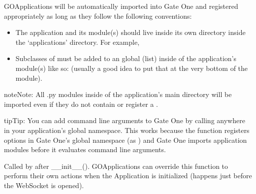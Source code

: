 \documentclass[letterpaper,10pt,openany]{sphinxmanual}
\begin{document}
\begin{fulllineitems}
GOApplications will be automatically imported into Gate One and registered
appropriately as long as they follow the following conventions:
\begin{itemize}
\item {} 
The application and its module(s) should live inside its own directory inside the `applications' directory.  For example, 

\item {} 
Subclasses of {\hyperref[Developer/server:gateone.core.server.GOApplication]{}} must be added to an  global (list) inside of the application's module(s) like so:  (usually a good idea to put that at the very bottom of the module).

\end{itemize}

\begin{notice}{note}{Note:}
All .py modules inside of the application's main directory will be
imported even if they do not contain or register a {\hyperref[Developer/server:gateone.core.server.GOApplication]{}}.
\end{notice}

\begin{notice}{tip}{Tip:}
You can add command line arguments to Gate One by calling
 anywhere in your application's global
namespace.  This works because the 
function registers options in Gate One's global namespace (as
) and Gate One imports application modules
before it evaluates command line arguments.
\end{notice}

\begin{fulllineitems}
\label{Developer/server:gateone.core.server.GOApplication.initialize}
Called by {\hyperref[Developer/server:gateone.core.server.ApplicationWebSocket.open]{}} after \_\_init\_\_().
GOApplications can override this function to perform their own actions
when the Application is initialized (happens just before the WebSocket
is opened).

\end{fulllineitems}



\end{fulllineitems}
\end{document}
